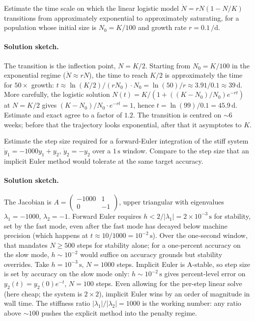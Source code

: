 \begin{exercise}
Estimate the time scale on which the linear logistic model
$\dot{N} = r N (1 - N/K)$ transitions from approximately
exponential to approximately saturating, for a population whose
initial size is $N_{0} = K/100$ and growth rate $r =
0.1\,\si{\per\day}$.

\paragraph{Solution sketch.} The transition is the inflection
point, $N = K/2$. Starting from $N_{0} = K/100$ in the
exponential regime ($\dot{N} \approx r N$), the time to reach
$K/2$ is approximately the time for $50\times$ growth: $t \approx
\ln(K/2)/(r N_{0}) \cdot N_{0} = \ln(50)/r \approx 3.91/0.1
\approx 39\,\si{\day}$. More carefully, the logistic solution
$N(t) = K/(1 + ((K - N_{0})/N_{0}) e^{-r t})$ at $N = K/2$ gives
$(K - N_{0})/N_{0} \cdot e^{-r t} = 1$, hence $t = \ln(99) /
0.1 = 45.9\,\si{\day}$. Estimate and exact agree to a factor of
$1.2$. The transition is centred on $\sim 6$ weeks; before that
the trajectory looks exponential, after that it asymptotes to
$K$.
\end{exercise}

\begin{exercise}
Estimate the step size required for a forward-Euler integration
of the stiff system $\dot{y}_{1} = -1000 y_{1} + y_{2}$,
$\dot{y}_{2} = -y_{2}$ over a $1\,\si{\second}$ window. Compare
to the step size that an implicit Euler method would tolerate at
the same target accuracy.

\paragraph{Solution sketch.} The Jacobian is
$A = \begin{pmatrix} -1000 & 1 \\ 0 & -1 \end{pmatrix}$, upper
triangular with eigenvalues $\lambda_{1} = -1000$, $\lambda_{2} =
-1$. Forward Euler requires $h < 2/|\lambda_{1}| = 2 \times
10^{-3}\,\si{\second}$ for stability, set by the fast mode, even
after the fast mode has decayed below machine precision (which
happens at $t \approx 10/1000 = 10^{-2}\,\si{\second}$). Over the
one-second window, that mandates $N \geq 500$ steps for
stability alone; for a one-percent accuracy on the slow mode,
$h \sim 10^{-2}$ would suffice on accuracy grounds but stability
overrides. Take $h = 10^{-3}\,\si{\second}$, $N = 1000$ steps.
Implicit Euler is A-stable, so step size is set by accuracy on
the slow mode only: $h \sim 10^{-2}\,\si{\second}$ gives
percent-level error on $y_{2}(t) = y_{2}(0) e^{-t}$, $N = 100$
steps. Even allowing for the per-step linear solve (here cheap;
the system is $2 \times 2$), implicit Euler wins by an order of
magnitude in wall time. The stiffness ratio
$|\lambda_{1}|/|\lambda_{2}| = 1000$ is the working number: any
ratio above $\sim 100$ pushes the explicit method into the
penalty regime.
\end{exercise}

